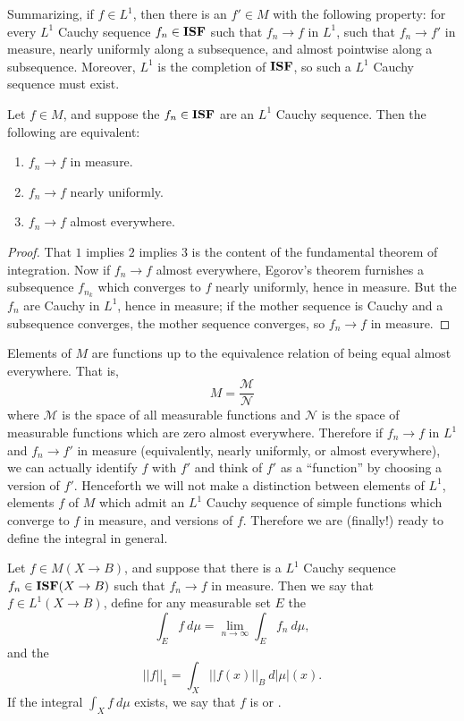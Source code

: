 \begin{subsec}
Summarizing, if $f \in L^1$, then there is an $f' \in M$ with the following property: for every $L^1$ Cauchy sequence $f_{n} \in \mathbf{ISF}$ such that $f_{n} \to f$ in $L^1$, such that $f_{n} \to f'$ in measure, nearly uniformly along a subsequence, and almost pointwise along a subsequence.
Moreover, $L^1$ is the completion of $\mathbf{ISF}$, so such a $L^1$ Cauchy sequence must exist.
\end{subsec}

\begin{corollary}
Let $f \in M$, and suppose the $f_{n} \in \mathbf{ISF}$ are an $L^1$ Cauchy sequence. Then the following are equivalent:
\begin{enumerate}
\item $f_{n} \to f$ in measure.
\item $f_{n} \to f$ nearly uniformly.
\item $f_{n} \to f$ almost everywhere.
\end{enumerate}
\end{corollary}
\begin{proof}
That $1$ implies $2$ implies $3$ is the content of the fundamental theorem of integration.
Now if $f_{n} \to f$ almost everywhere, Egorov's theorem furnishes a subsequence $f_{n_{k}}$ which converges to $f$ nearly uniformly, hence in measure.
But the $f_{n}$ are Cauchy in $L^1$, hence in measure; if the mother sequence is Cauchy and a subsequence converges, the mother sequence converges, so $f_{n} \to f$ in measure.
\end{proof}

\begin{subsec}
Elements of $M$ are functions up to the equivalence relation of being equal almost everywhere.
That is,
\[M = \frac{\mathcal M}{\mathcal N}\]
where $\mathcal M$ is the space of all measurable functions and $\mathcal N$ is the space of measurable functions which are zero almost everywhere.
Therefore if $f_{n} \to f$ in $L^1$ and $f_{n} \to f'$ in measure (equivalently, nearly uniformly, or almost everywhere), we can actually identify $f$ with $f'$ and think of $f'$ as a ``function'' by choosing a version of $f'$.
Henceforth we will not make a distinction between elements of $L^1$, elements $f$ of $M$ which admit an $L^1$ Cauchy sequence of simple functions which converge to $f$ in measure, and versions of $f$.
Therefore we are (finally!) ready to define the integral in general.
\end{subsec}

\begin{definition}
Let $f \in M(X \to B)$, and suppose that there is a $L^1$ Cauchy sequence $f_{n} \in \mathbf{ISF}(X \to B)$ such that $f_{n} \to f$ in measure. Then we say that $f \in L^1(X \to B)$, define for any measurable set $E$ the 
\[\int_{E} f ~d\mu = \lim_{n \to \infty} \int_{E} f_{n}~d\mu,\]
and the 
\[||f||_1 = \int_{X} ||f(x)||_{B} ~d|\mu|(x).\]
If the integral $\int_{X} f~d\mu$ exists, we say that $f$ is  or .
\end{definition}

